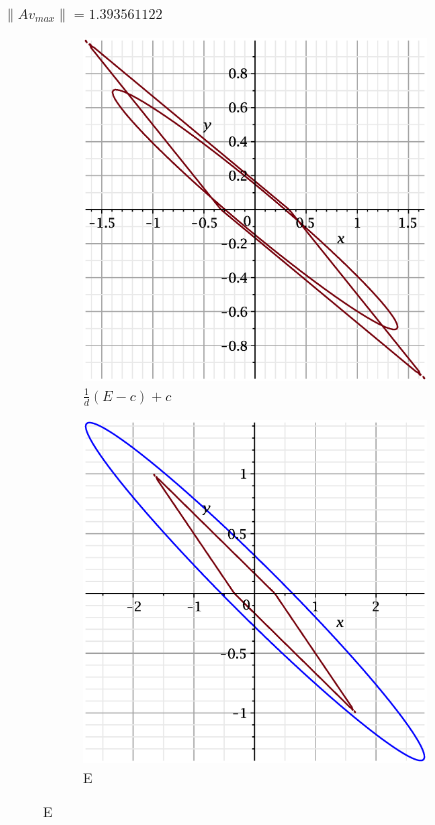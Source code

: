 \documentclass{beamer}
\begin{document}
\begin{frame}
$\|Av_{max}\| = 1.393561122$  
    \begin{figure}
    \begin{subfigure}{.5\textwidth}
        \centering
        \includegraphics[width=.8\linewidth]{pictures/5.eps}
        \caption{$\displaystyle\frac{1}{d}(E-c)+c$}
    \label{fig:sfig1}
    \end{subfigure}%
    \begin{subfigure}{.5\textwidth}
        \centering
        \includegraphics[width=.8\linewidth]{pictures/1_5.eps}
        \caption{E}
    \label{fig:sfig2}
    \end{subfigure}
\end{figure}

\end{frame}
\end{document}
